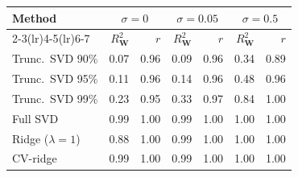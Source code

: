 \begin{tabular}{lrrrrrr}
\toprule
Method & \multicolumn{2}{c}{$\sigma=0$} & \multicolumn{2}{c}{$\sigma=0.05$} & \multicolumn{2}{c}{$\sigma=0.5$} \\
\cmidrule(lr){2-3}\cmidrule(lr){4-5}\cmidrule(lr){6-7}
 & $R^2_{\mathbf{W}}$ & $r$& $R^2_{\mathbf{W}}$ & $r$& $R^2_{\mathbf{W}}$ & $r$ \\
\midrule
Trunc.\ SVD 90\% & 0.07 & 0.96 & 0.09 & 0.96 & 0.34 & 0.89 \\
Trunc.\ SVD 95\% & 0.11 & 0.96 & 0.14 & 0.96 & 0.48 & 0.96 \\
Trunc.\ SVD 99\% & 0.23 & 0.95 & 0.33 & 0.97 & 0.84 & 1.00 \\
Full SVD & 0.99 & 1.00 & 0.99 & 1.00 & 1.00 & 1.00 \\
Ridge ($\lambda=1$) & 0.88 & 1.00 & 0.99 & 1.00 & 1.00 & 1.00 \\
CV-ridge & 0.99 & 1.00 & 0.99 & 1.00 & 1.00 & 1.00 \\
\bottomrule
\end{tabular}
